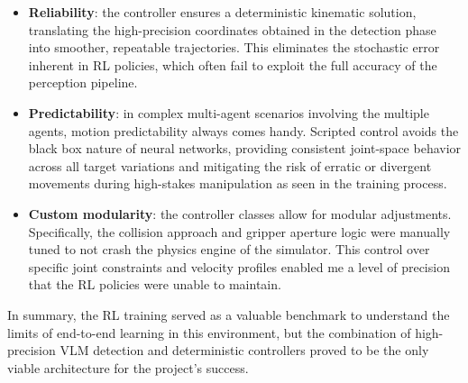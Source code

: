 \begin{itemize}
	\item \textbf{Reliability}: the  controller ensures a deterministic kinematic solution, translating the high-precision coordinates obtained in the detection phase  into smoother, repeatable trajectories. This eliminates the stochastic error inherent in RL policies, which often fail to exploit the full accuracy of the perception pipeline.
	
	\item \textbf{Predictability}: in complex multi-agent scenarios involving the multiple agents, motion predictability always comes handy. Scripted control avoids the black box nature of neural networks, providing consistent joint-space behavior across all target variations and mitigating the risk of erratic or divergent movements during high-stakes manipulation as seen in the training process.
	
	\item \textbf{Custom modularity}: the controller classes allow for modular adjustments. Specifically, the collision approach and gripper aperture logic were manually tuned to not crash the physics engine of the simulator. This control over specific joint constraints and velocity profiles enabled me a level of  precision that the RL policies were unable to maintain.
\end{itemize}

In summary, the RL training served as a valuable benchmark to understand the limits of end-to-end learning in this environment, but the combination of high-precision VLM detection and deterministic controllers proved to be the only viable architecture for the project's success.


